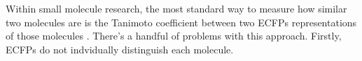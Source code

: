 %

Within small molecule research, the most standard way to measure how similar two molecules are is the Tanimoto coefficient between two ECFPs representations of those molecules \citep{Capecchi2020, LopezPerez2024}. There's a handful of problems with this approach. Firstly, ECFPs do not indvidually distinguish each molecule.

